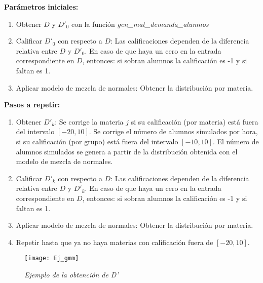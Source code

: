 \textbf{Parámetros iniciales:}

\begin{enumerate}
\item Obtener $D$ y $D'_{0}$ con la función \textit{gen\_mat\_demanda\_alumnos}

\item Calificar $D'_{0}$ con respecto a $D$: Las calificaciones dependen de la diferencia relativa entre $D$ y $D'_{0}$. En caso de que haya un cero en la entrada correspondiente en $D$, entonces: si sobran alumnos la calificación es -1 y si faltan es 1.

\item Aplicar modelo de mezcla de normales: Obtener la distribución por materia.
\end{enumerate}

\textbf{Pasos a repetir:}

\begin{enumerate}
\item Obtener $D'_{k}$: Se corrige la materia $j$ si su calificación (por materia) está fuera del intervalo $[-20,10]$. Se corrige el número de alumnos simulados por hora, si su calificación (por grupo) está fuera del intervalo $[-10,10]$. El número de alumnos simulados se genera a partir de la distribución obtenida con el modelo de mezcla de normales.

\item Calificar $D'_{k}$ con respecto a $D$: Las calificaciones dependen de la diferencia relativa entre $D$ y $D'_{k}$. En caso de que haya un cero en la entrada correspondiente en $D$, entonces: si sobran alumnos la calificación es -1 y si faltan es 1.

\item Aplicar modelo de mezcla de normales: Obtener la distribución por materia.

\item Repetir hasta que ya no haya materias con calificación fuera de $[-20,10]$.
\end{enumerate}


\begin{figure}[H]
\centering
\texttt{[image: Ej\_gmm]} %
\caption{\textit{Ejemplo de la obtención de D'}}
\end{figure}

